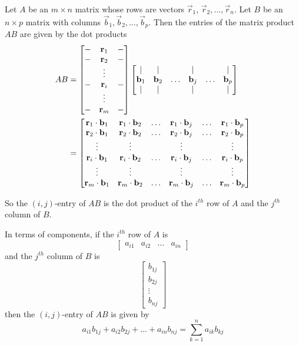 \documentclass{ximera}
\begin{document}
\begin{definition}\label{def:matmatproduct} Let $A$ be an $m\times n$ matrix whose rows are vectors $\vec{r}_1$, $\vec{r}_2,\ldots ,\vec{r}_n$.  Let $B$ be an $n\times p$ matrix with columns $\vec{b}_1, \vec{b}_2, \ldots, \vec{b}_p$.  Then the entries of the matrix product $AB$ are given by the dot products
\begin{align*}AB&=\begin{bmatrix}-&\mathbf{r}_1&-\\-&\mathbf{r}_2&-\\ &\vdots & \\-&\mathbf{r}_i &-\\ &\vdots& \\-&\mathbf{r}_m&-\end{bmatrix}\begin{bmatrix}|&|&&|&&|\\\mathbf{b}_1& \mathbf{b}_2 &\ldots  & \mathbf{b}_j&\ldots& \mathbf{b}_p\\|&|&&|&&|\end{bmatrix}\\ &=\begin{bmatrix}\mathbf{r}_1\cdot \mathbf{b}_1&\mathbf{r}_1\cdot \mathbf{b}_2&\ldots&\mathbf{r}_1\cdot \mathbf{b}_j&\ldots &\mathbf{r}_1\cdot \mathbf{b}_p\\\mathbf{r}_2\cdot \mathbf{b}_1&\mathbf{r}_2\cdot \mathbf{b}_2&\ldots&\mathbf{r}_2\cdot \mathbf{b}_j&\ldots &\mathbf{r}_2\cdot \mathbf{b}_p\\\vdots&\vdots&&\vdots&&\vdots\\\mathbf{r}_i\cdot \mathbf{b}_1&\mathbf{r}_i\cdot \mathbf{b}_2&\ldots&\mathbf{r}_i\cdot \mathbf{b}_j&\ldots &\mathbf{r}_i\cdot \mathbf{b}_p\\\vdots&\vdots&&\vdots&&\vdots\\\mathbf{r}_m\cdot \mathbf{b}_1&\mathbf{r}_m\cdot \mathbf{b}_2&\ldots&\mathbf{r}_m\cdot \mathbf{b}_j&\ldots &\mathbf{r}_m\cdot \mathbf{b}_p\end{bmatrix}
\end{align*}
\end{definition}

So the $(i,j)$-entry of $AB$ is the dot product of the $i^{th}$ row of $A$ and the $j^{th}$ column of $B$.  

In terms of components, if the $i^{th}$ row of $A$ is $$\begin{bmatrix}a_{i1}& a_{i2} &\ldots &a_{in}\end{bmatrix}$$ and the $j^{th}$ column of $B$ is 
$$\begin{bmatrix}b_{1j}\\b_{2j}\\\vdots\\b_{nj}\end{bmatrix}$$
then the $(i,j)$-entry of $AB$ is given by
\begin{equation}\label{eq:ijentrymatrixproduct}a_{i1}b_{1j}+a_{i2}b_{2j}+\dots +a_{in}b_{nj}=\sum_{k=1}^na_{ik}b_{kj}
\end{equation}
\end{document}
